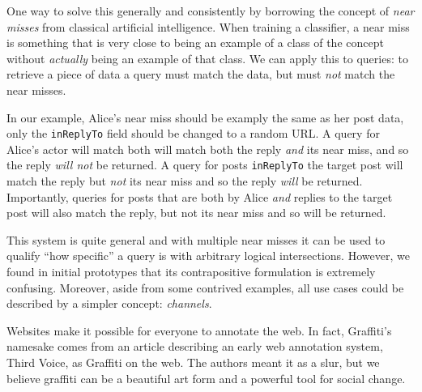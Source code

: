 One way to solve this generally and consistently by borrowing the concept of \emph{near misses} from classical artificial intelligence.
When training a classifier, a near miss is something that is very close to being an example of a class of the concept without \emph{actually} being an example of that class.
We can apply this to queries: to retrieve a piece of data a query must match the data, but must \emph{not} match the near misses.

In our example, Alice's near miss should be examply the same as her post data, only
the \texttt{inReplyTo} field should be changed to a random URL.
A query for Alice's actor will match both will match both the reply \emph{and} its near miss, and so the reply \emph{will not} be returned.
A query for posts \texttt{inReplyTo} the target post will match the reply but \emph{not} its near miss and so the reply \emph{will} be returned.
Importantly, queries for posts that are both by Alice \emph{and} replies to the target post will also match the reply, but not its near miss and so will be returned.

This system is quite general and with multiple near misses it can be used to qualify ``how specific'' a query is with arbitrary logical intersections.
However, we found in initial prototypes that its contrapositive formulation is extremely confusing.
Moreover, aside from some contrived examples, all use cases could be described by a simpler concept: \emph{channels}.


Websites make it possible for everyone to annotate the web.
In fact, Graffiti's namesake comes from an article
describing an early web annotation system, Third Voice,
as Graffiti on the web.
The authors meant it as a slur, but we believe graffiti
can be a beautiful art form and a powerful tool for social change.
